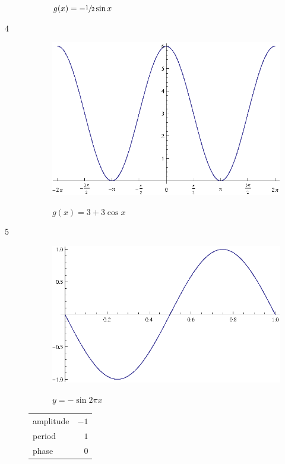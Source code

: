 \documentclass{exam}
\begin{document}
\begin{description}
\begin{figure}[H]
        $g(x) = - \sfrac{1}{2} \sin x$
      \end{figure}

    \item[4]
      \begin{figure}[H]
        \centering
        \includegraphics[scale=0.9]{example04.eps}

        $g(x) = 3 + 3 \cos x$
      \end{figure}

    \item[5]
      \begin{figure}[H]
        \centering
        \includegraphics[scale=0.9]{example05.eps}

        $y = - \sin 2 \pi x$
      \end{figure}

      \begin{tabular}[H]{lr}
        \toprule
        amplitude & $-1$ \\
        period    & $1$ \\
        phase     & $0$ \\
        \bottomrule
      \end{tabular}


\end{description}
\end{document}
